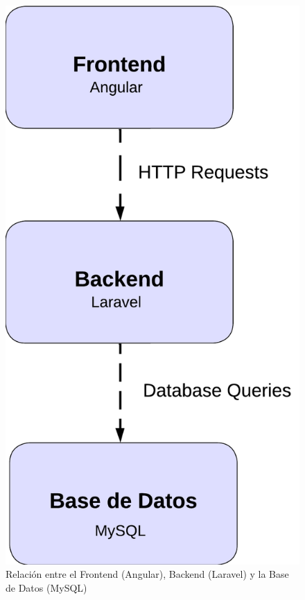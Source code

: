 \begin{figure}[H]
\begin{center}
\includegraphics[scale=0.80]{./Images/diagramaTech.png}
\caption{Relación entre el Frontend (Angular), Backend (Laravel) y la Base de Datos (MySQL)}

\label{fig:fig1}

\end{center}
\end{figure}


